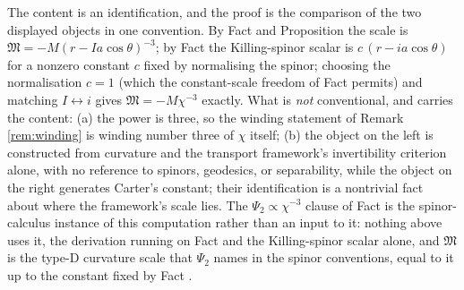 The content is an identification, and the proof is the comparison of the two displayed objects in one convention. By Fact  and Proposition  the scale is $\mathfrak M = -M(r - Ia\cos\theta)^{-3}$; by Fact  the Killing-spinor scalar is $c\,(r - ia\cos\theta)$ for a nonzero constant $c$ fixed by normalising the spinor; choosing the normalisation $c = 1$ (which the constant-scale freedom of Fact  permits) and matching $I \leftrightarrow i$ gives $\mathfrak M = -M\chi^{-3}$ exactly. What is \emph{not} conventional, and carries the content: (a) the power is three, so the winding statement of Remark \ref{rem:winding} is winding number three of $\chi$ itself; (b) the object on the left is constructed from curvature and the transport framework's invertibility criterion alone, with no reference to spinors, geodesics, or separability, while the object on the right generates Carter's constant; their identification is a nontrivial fact about where the framework's scale lies. The $\Psi_2 \propto \chi^{-3}$ clause of Fact  is the spinor-calculus instance of this computation rather than an input to it: nothing above uses it, the derivation running on Fact  and the Killing-spinor scalar alone, and $\mathfrak M$ is the type-D curvature scale that $\Psi_2$ names in the spinor conventions, equal to it up to the constant fixed by Fact .
